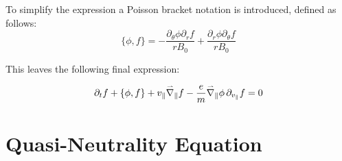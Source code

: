 To simplify the expression a Poisson bracket notation is introduced, defined as follows:
\begin{equation}
 \{\phi,f\}=-\frac{\partial_\theta\phi\partial_rf}{rB_0}+\frac{\partial_r\phi\partial_\theta f}{rB_0}
\end{equation}

This leaves the following final expression:

\begin{equation}\label{eq::Continuity Cylindrical}
 \partial_t f + \{\phi,f\} + v_\parallel \accentset{\rightharpoonup}{\nabla}_\parallel f - \frac{e}{m}\accentset{\rightharpoonup}{\nabla}_\parallel\phi\,  \partial_{v_\parallel} f=0
\end{equation}

\section{Quasi-Neutrality Equation}
% 
% 
% 
% 
% 
